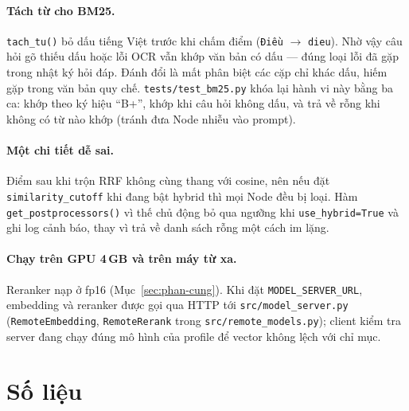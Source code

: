 \paragraph{Tách từ cho BM25.} \texttt{tach\_tu()} bỏ dấu tiếng Việt trước khi chấm điểm
(\texttt{Điều} $\rightarrow$ \texttt{dieu}). Nhờ vậy câu hỏi gõ thiếu dấu hoặc lỗi OCR vẫn khớp văn
bản có dấu --- đúng loại lỗi đã gặp trong nhật ký hỏi đáp. Đánh đổi là mất phân biệt các cặp chỉ
khác dấu, hiếm gặp trong văn bản quy chế. \texttt{tests/test\_bm25.py} khóa lại hành vi này bằng ba
ca: khớp theo ký hiệu ``B+'', khớp khi câu hỏi không dấu, và trả về rỗng khi không có từ nào khớp
(tránh đưa Node nhiễu vào prompt).

\paragraph{Một chi tiết dễ sai.} Điểm sau khi trộn RRF không cùng thang với cosine, nên nếu đặt
\texttt{similarity\_cutoff} khi đang bật hybrid thì mọi Node đều bị loại. Hàm
\texttt{get\_postprocessors()} vì thế chủ động bỏ qua ngưỡng khi \texttt{use\_hybrid=True} và ghi log
cảnh báo, thay vì trả về danh sách rỗng một cách im lặng.

\paragraph{Chạy trên GPU 4\,GB và trên máy từ xa.} Reranker nạp ở fp16 (Mục~\ref{sec:phan-cung}). Khi đặt
\texttt{MODEL\_SERVER\_URL}, embedding và reranker được gọi qua HTTP tới \texttt{src/model\_server.py}
(\texttt{RemoteEmbedding}, \texttt{RemoteRerank} trong \texttt{src/remote\_models.py}); client kiểm tra server
đang chạy đúng mô hình của profile để vector không lệch với chỉ mục.

\section{Số liệu}


